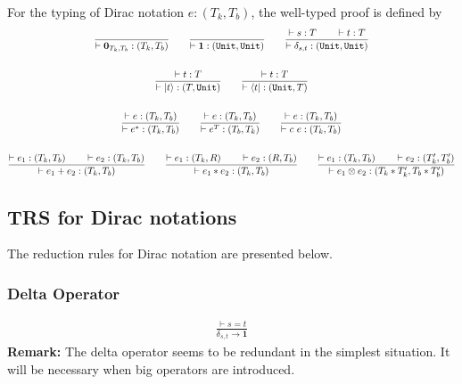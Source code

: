 \begin{definition} 
  For the typing of Dirac notation $e : (T_k, T_b)$, the well-typed proof is defined by
  \begin{gather*}
    \frac{}{\vdash \mathbf{0}_{T_k, T_b} : (T_k, T_b)}
    \qquad
    \frac{}{\vdash \mathbf{1} : (\texttt{Unit}, \texttt{Unit})}
    \qquad
    \frac{\vdash s : T \qquad \vdash t : T}{\vdash \delta_{s, t} : (\texttt{Unit}, \texttt{Unit})}\\
    \ \\
    \frac{\vdash t : T}{\vdash |t\rangle : (T, \texttt{Unit})}
    \qquad 
    \frac{\vdash t : T}{\vdash \langle t| : (\texttt{Unit}, T)}\\
    \ \\
    \frac{\vdash e : (T_k, T_b)}{\vdash e^* : (T_k, T_b)}
    \qquad
    \frac{\vdash e : (T_k, T_b)}{\vdash e^T : (T_b, T_k)}
    \qquad
    \frac{\vdash e : (T_k, T_b)}{\vdash c\ e : (T_k, T_b)}\\
    \ \\
    \frac{\vdash e_1 : (T_k, T_b)\qquad \vdash e_2 : (T_k, T_b)}{\vdash e_1 + e_2 : (T_k, T_b)}
    \qquad 
    \frac{\vdash e_1 : (T_k, R)\qquad \vdash e_2 : (R, T_b)}{\vdash e_1 * e_2 : (T_k, T_b)}
    \qquad
    \frac{\vdash e_1 : (T_k, T_b)\qquad \vdash e_2 : (T_k', T_b')}{\vdash e_1 \otimes e_2 : (T_k * T_k', T_b * T_b')}
  \end{gather*}
\end{definition}




\subsection{TRS for Dirac notations}
The reduction rules for Dirac notation are presented below.


\subsubsection*{Delta Operator}
\begin{align*}
  \frac{\vdash s = t}{\delta_{s, t} \to \mathbf{1}}
\end{align*}
\textbf{Remark: } The delta operator seems to be redundant in the simplest situation. It will be necessary when big operators are introduced.



